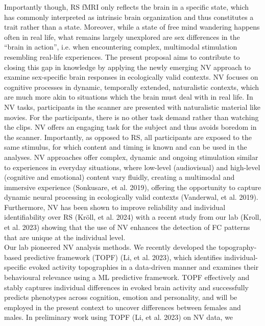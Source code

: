 \documentclass[11pt,a4paper]{article}
\begin{document}
\par\vspace{-1\parskip}\noindent
Importantly though, RS fMRI only reflects the brain in a specific state, which has commonly interpreted as 
intrinsic brain organization and thus constitutes a trait rather than a state. Moreover, while a state of free mind wandering happens often in real life, what remains largely unexplored are sex differences in the “brain in action”, i.e. when encountering complex, multimodal stimulation resembling real-life experiences.
The present proposal aims to contribute to closing this gap in knowledge by applying the newly 
emerging NV approach to examine sex-specific brain responses in ecologically valid contexts. NV focuses on 
cognitive processes in dynamic, temporally extended, naturalistic contexts, which are much more akin to
situations which the brain must deal with in real life. In NV tasks, participants in the scanner are 
presented with naturalistic material like movies. For the participants, there is no other task demand rather 
than watching the clips. NV offers an engaging task for the subject and thus avoids boredom in the scanner. 
Importantly, as opposed to RS, all participants are exposed to the same stimulus, for which content and timing 
is known and can be used in the analyses. NV approaches offer complex, dynamic and ongoing stimulation similar 
to experiences in everyday situations, where low-level (audiovisual) and high-level (cognitive and emotional) 
content vary fluidly, creating a multimodal and immersive experience (Sonkusare, et al. 2019), offering the 
opportunity to capture dynamic neural processing in ecologically valid contexts  (Vanderwal, et al. 2019). 
Furthermore, NV has been shown to improve reliability and individual identifiability over RS (Kröll, et al. 2024) 
with a recent study from our lab (Kroll, et al. 2023) showing that the use of NV enhances the detection of 
FC patterns that are unique at the individual level.\\ 
Our lab pioneered NV analysis methods. We recently developed the topography-based predictive framework 
(TOPF) (Li, et al. 2023), which identifies individual-specific evoked activity topographies in a data-driven 
manner and examines their behavioural relevance using a ML predictive framework. 
TOPF effectively and stably captures individual differences in evoked brain activity and successfully predicts phenotypes across 
cognition, emotion and personality, and will be employed in the present context to uncover differences between 
females and males. In preliminary work using TOPF (Li, et al. 2023) on NV data, we 
\end{document}
